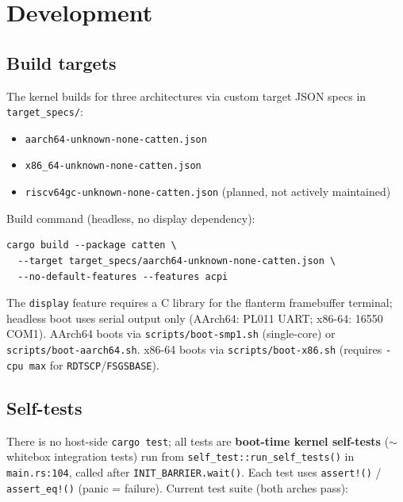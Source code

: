 \chapter{Development}

\section{Build targets}

The kernel builds for three architectures via custom target JSON specs in
\texttt{target\_specs/}:

\begin{itemize}
    \item \texttt{aarch64-unknown-none-catten.json}
    \item \texttt{x86\_64-unknown-none-catten.json}
    \item \texttt{riscv64gc-unknown-none-catten.json} (planned, not actively
        maintained)
\end{itemize}

Build command (headless, no display dependency):

\begin{verbatim}
cargo build --package catten \
  --target target_specs/aarch64-unknown-none-catten.json \
  --no-default-features --features acpi
\end{verbatim}

The \texttt{display} feature requires a C library for the flanterm framebuffer
terminal; headless boot uses serial output only (AArch64: PL011 UART; x86-64:
16550 COM1). AArch64 boots via \texttt{scripts/boot-smp1.sh} (single-core) or
\texttt{scripts/boot-aarch64.sh}. x86-64 boots via
\texttt{scripts/boot-x86.sh} (requires \texttt{-cpu max} for
\texttt{RDTSCP}/\texttt{FSGSBASE}).

\section{Self-tests}

There is no host-side \texttt{cargo test}; all tests are \textbf{boot-time
kernel self-tests} ($\sim$whitebox integration tests) run from
\texttt{self\_test::run\_self\_tests()} in \texttt{main.rs:104}, called after
\texttt{INIT\_BARRIER.wait()}. Each test uses \texttt{assert!()} /
\texttt{assert\_eq!()} (panic = failure). Current test suite (both arches
pass):


